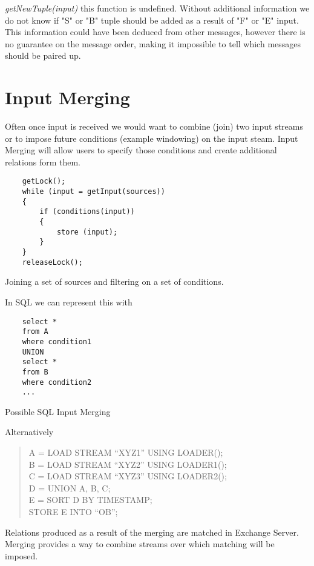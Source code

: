 \documentclass{article}
\begin{document}
\noindent \emph{getNewTuple(input)} this function is undefined. Without additional information we do not know if "S" or "B" tuple should be added as a result of "F" or "E" input. This information could have been deduced from other messages, however there is no guarantee on the message order, making it impossible to tell which messages should be paired up. 

\section{Input Merging}

Often once input is received we would want to combine (join) two input streams or to impose future conditions (example windowing) on the input steam. Input Merging will allow users to specify those conditions and create additional relations form them.

\begin{program}
    \begin{verbatim}   
    getLock();
    while (input = getInput(sources))
    {
        if (conditions(input))
        {
            store (input);
        }
    }
    releaseLock();
    \end{verbatim}
\caption{Joining a set of sources and filtering on a set of conditions.}
\end{program}

In SQL we can represent this with 

\begin{program}
    \begin{verbatim}   
    select *
    from A
    where condition1
    UNION
    select *
    from B
    where condition2
    ...
    \end{verbatim}
\caption{Possible SQL Input Merging}
\end{program}

Alternatively 

\begin{quote}
A = LOAD STREAM {}``XYZ1'' USING LOADER();\\
B = LOAD STREAM {}``XYZ2'' USING LOADER1();\\
C = LOAD STREAM {}``XYZ3'' USING LOADER2();\\

D = UNION A, B, C;\\
E = SORT D BY TIMESTAMP;\\
STORE E INTO {}``OB'';
\end{quote}


Relations produced as a result of the merging are matched in Exchange Server. Merging provides a way to combine streams over which matching will be imposed. 
\end{document}
